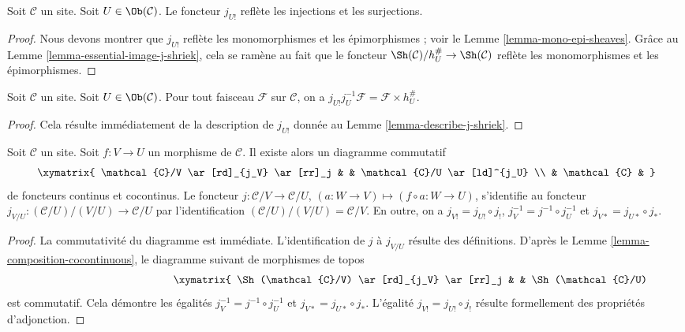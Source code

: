 \begin{lemma}
\label{lemma-j-shriek-reflects-injections-surjections}
Soit $\mathcal{C}$ un site. Soit $U \in \Ob(\mathcal{C})$.
Le foncteur $j_{U!}$ reflète les injections et les surjections.
\end{lemma}

\begin{proof}
Nous devons montrer que $j_{U!}$ reflète les monomorphismes et les
épimorphismes ; voir le Lemme \ref{lemma-mono-epi-sheaves}.
Grâce au Lemme \ref{lemma-essential-image-j-shriek}, cela se ramène au fait
que le foncteur $\Sh(\mathcal{C})/h_U^\# \to \Sh(\mathcal{C})$
reflète les monomorphismes et les épimorphismes.
\end{proof}

\begin{lemma}
\label{lemma-compute-j-shriek-restrict}
Soit $\mathcal{C}$ un site. Soit $U \in \Ob(\mathcal{C})$.
Pour tout faisceau $\mathcal{F}$ sur $\mathcal{C}$, on a
$j_{U!}j_U^{-1}\mathcal{F} = \mathcal{F} \times h_U^\#$.
\end{lemma}

\begin{proof}
Cela résulte immédiatement de la description de $j_{U!}$ donnée au
Lemme \ref{lemma-describe-j-shriek}.
\end{proof}

\begin{lemma}
\label{lemma-relocalize}
Soit $\mathcal{C}$ un site.
Soit $f : V \to U$ un morphisme de $\mathcal{C}$.
Il existe alors un diagramme commutatif
$$
\xymatrix{
\mathcal{C}/V \ar[rd]_{j_V} \ar[rr]_j & &
\mathcal{C}/U \ar[ld]^{j_U} \\
& \mathcal{C} &
}
$$
de foncteurs continus et cocontinus.
Le foncteur $j : \mathcal{C}/V \to \mathcal{C}/U$,
$(a : W \to V) \mapsto (f \circ a : W \to U)$,
s’identifie au foncteur
$j_{V/U} : (\mathcal{C}/U)/(V/U) \to \mathcal{C}/U$
par l’identification $(\mathcal{C}/U)/(V/U) = \mathcal{C}/V$.
En outre, on a $j_{V!} = j_{U!} \circ j_!$,
$j_V^{-1} = j^{-1} \circ j_U^{-1}$ et
$j_{V*} = j_{U*} \circ j_*$.
\end{lemma}

\begin{proof}
La commutativité du diagramme est immédiate.
L’identification de $j$ à $j_{V/U}$ résulte des définitions.
D’après le Lemme \ref{lemma-composition-cocontinuous}, le diagramme suivant
de morphismes de topos
\begin{equation}
\label{equation-relocalize}
\vcenter{
\xymatrix{
\Sh(\mathcal{C}/V) \ar[rd]_{j_V} \ar[rr]_j & &
\Sh(\mathcal{C}/U) \ar[ld]^{j_U} \\
& \Sh(\mathcal{C}) &
}
}
\end{equation}
est commutatif. Cela démontre les égalités
$j_V^{-1} = j^{-1} \circ j_U^{-1}$ et
$j_{V*} = j_{U*} \circ j_*$.
L’égalité $j_{V!} = j_{U!} \circ j_!$ résulte formellement des propriétés
d’adjonction.
\end{proof}

